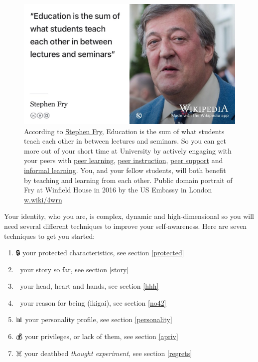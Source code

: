 \documentclass[
]{book}
\providecommand{\tightlist}{%
  \setlength{\itemsep}{0pt}\setlength{\parskip}{0pt}}
\begin{document}
\begin{figure}

{\centering \includegraphics[width=1\linewidth]{images/fry-lecture} 

}

\caption{According to \href{https://en.wikipedia.org/wiki/Stephen_Fry}{Stephen Fry}, Education is the sum of what students teach each other in between lectures and seminars. \citep{frychronicles} So you can get more out of your short time at University by actively engaging with your peers with \href{https://en.wikipedia.org/wiki/Peer_learning}{peer learning}, \href{https://en.wikipedia.org/wiki/Peer_instruction}{peer instruction}, \href{http://www.peersupport.manchester.ac.uk/}{peer support} and \href{https://en.wikipedia.org/wiki/Informal_learning}{informal learning}. You, and your fellow students, will both benefit by teaching and learning from each other. Public domain portrait of Fry at Winfield House in 2016 by the US Embassy in London \href{https://w.wiki/4wrn}{w.wiki/4wrn}}\label{fig:stephen-fry-lecture-fig}
\end{figure}



Your identity, who you are, is complex, dynamic and high-dimensional so you will need several different techniques to improve your self-awareness. Here are seven techniques to get you started:

\begin{enumerate}
\def\labelenumi{\arabic{enumi}.}
\tightlist
\item
  🔒 your protected characteristics, see section \ref{protected}
\item
  📕 your story so far, see section \ref{story}
\item
  🙂 your head, heart and hands, see section \ref{hhh}
\item
  🤔 your reason for being (ikigai), see section \ref{no42}
\item
  📊 your personality profile, see section \ref{personality}
\item
  💰 your privileges, or lack of them, see section \ref{apriv}
\item
  ☠️ your deathbed \emph{thought experiment}, see section \ref{regrets}
\end{enumerate}
\end{document}
